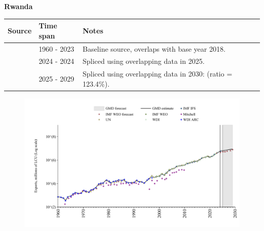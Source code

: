 \documentclass[12pt,a4paper,landscape]{article}
\begin{document}
\begin{adjustbox}{max totalsize={\paperwidth}{\paperheight},center}
\begin{minipage}[t][\textheight][t]{\textwidth}
\vspace*{0.5cm}
{}
\begin{center}
{\Large\bfseries Rwanda}
\end{center}
\vspace{0.5cm}
\begin{table}[H]
\centering
\small
\begin{tabular}{|l|l|l|}
\hline
\textbf{Source} & \textbf{Time span} & \textbf{Notes} \\
\hline
\rowcolor{white}\cite{WDI}& 1960 - 2023 &Baseline source, overlaps with base year 2018.\\
\rowcolor{lightgray}\cite{IMF_IFS}& 2024 - 2024 &Spliced using overlapping data in 2025.\\
\rowcolor{white}\cite{IMF_WEO_forecast}& 2025 - 2029 &Spliced using overlapping data in 2030: (ratio = 123.4\%).\\
\hline
\end{tabular}
\end{table}
\begin{figure}[H]
\centering
\includegraphics[width=\textwidth,height=0.6\textheight,keepaspectratio]{graphs/RWA_exports.pdf}
\end{figure}
\end{minipage}
\end{adjustbox}
\end{document}
